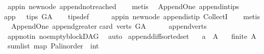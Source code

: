 \begin{isabellebody}
\ app{\isacharunderscore}{\kern0pt}in\ new{\isacharunderscore}{\kern0pt}node\ append{\isacharunderscore}{\kern0pt}not{\isacharunderscore}{\kern0pt}reached\isanewline
\ \ \isamarkupfalse%
\ metis%
\endisatagproof
{\isafoldproof}%
%
\isadelimproof
\isanewline
%
\endisadelimproof
\isanewline
{}\isamarkupfalse%
\ {\isacharparenleft}{\kern0pt}\ Append{\isacharunderscore}{\kern0pt}One{\isacharparenright}{\kern0pt}\ append{\isacharunderscore}{\kern0pt}in{\isacharunderscore}{\kern0pt}tips{\isacharcolon}{\kern0pt}\isanewline
{\isachardoublequoteopen}app\ \ {\isasymin}\ tips\ G{\isacharunderscore}{\kern0pt}A{\isachardoublequoteclose}\isanewline
%
\isadelimproof
\ \ %
\endisadelimproof
%
\isatagproof
{}\isamarkupfalse%
\ tips{\isacharunderscore}{\kern0pt}def\ \ \isanewline
\ \ \isamarkupfalse%
\ app{\isacharunderscore}{\kern0pt}in\ new{\isacharunderscore}{\kern0pt}node\ append{\isacharunderscore}{\kern0pt}is{\isacharunderscore}{\kern0pt}tip\ CollectI\isanewline
\ \ \isamarkupfalse%
\ metis%
\endisatagproof
{\isafoldproof}%
%
\isadelimproof
\isanewline
%
\endisadelimproof
\isanewline
{}\isamarkupfalse%
\ {\isacharparenleft}{\kern0pt}\ Append{\isacharunderscore}{\kern0pt}One{\isacharparenright}{\kern0pt}\ append{\isacharunderscore}{\kern0pt}greater{\isacharunderscore}{\kern0pt}{}{\isacharcolon}{\kern0pt}\isanewline
{\isachardoublequoteopen}card\ {\isacharparenleft}{\kern0pt}verts\ G{\isacharunderscore}{\kern0pt}A{\isacharparenright}{\kern0pt}\ {\isachargreater}{\kern0pt}\ {}{\isachardoublequoteclose}\isanewline
%
\isadelimproof
\ \ %
\endisadelimproof
%
\isatagproof
{}\isamarkupfalse%
\ append{\isacharunderscore}{\kern0pt}verts\ \isanewline
\ \ \isamarkupfalse%
\ app{\isacharunderscore}{\kern0pt}notin\ no{\isacharunderscore}{\kern0pt}empty{\isacharunderscore}{\kern0pt}blockDAG\ \isamarkupfalse%
\ auto%
\endisatagproof
{\isafoldproof}%
%
\isadelimproof
\isanewline
%
\endisadelimproof
\isanewline
\isanewline
{}\isamarkupfalse%
\ append{\isacharunderscore}{\kern0pt}diff{\isacharunderscore}{\kern0pt}sorted{\isacharunderscore}{\kern0pt}set{\isacharcolon}{\kern0pt}\isanewline
\ \ \ {\isachardoublequoteopen}a\ {\isasymin}\ A{\isachardoublequoteclose}\isanewline
\ \ \ {\isachardoublequoteopen}finite\ A{\isachardoublequoteclose}\isanewline
{}\ {\isachardoublequoteopen}sum{\isacharunderscore}{\kern0pt}list\ {\isacharparenleft}{\kern0pt}{\isacharparenleft}{\kern0pt}map\ {\isacharparenleft}{\kern0pt}P{\isacharcolon}{\kern0pt}{\isacharcolon}{\kern0pt}{\isacharparenleft}{\kern0pt}{\isacharprime}{\kern0pt}a{\isacharcolon}{\kern0pt}{\isacharcolon}{\kern0pt}linorder\ {\isasymRightarrow}\ int{\isacharparenright}{\kern0pt}{\isacharparenright}{\kern0pt}{\isacharparenright}{\kern0pt}\isanewline

\end{isabellebody}
